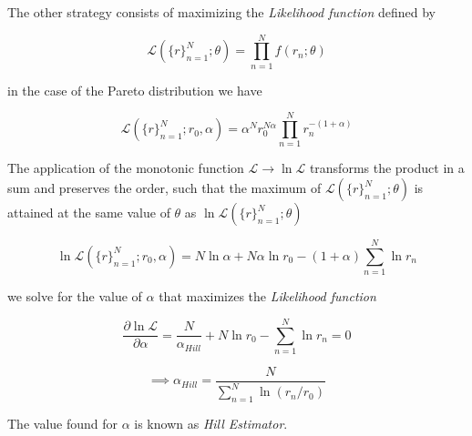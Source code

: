 \documentclass[11pt]{article}
\begin{document}
The other strategy consists of maximizing the \emph{Likelihood function}
defined by

\[\mathcal{L}(\{r\}_{n=1}^N;\theta) = \prod_{n=1}^{N}f(r_n;\theta)\]

in the case of the Pareto distribution we have

\[\mathcal{L}(\{r\}_{n=1}^N; r_0, \alpha) = \alpha^N r_0^{N\alpha} \prod_{n=1}^{N}r_n^{-(1+\alpha)}\]

The application of the monotonic function
\(\mathcal{L}\rightarrow\ln{\mathcal{L}}\) transforms the product in a
sum and preserves the order, such that the maximum of
\(\mathcal{L}(\{r\}_{n=1}^N;\theta)\) is attained at the same value of
\(\theta\) as \(\ln{\mathcal{L}(\{r\}_{n=1}^N;\theta)}\)

\[\ln{\mathcal{L}(\{r\}_{n=1}^N; r_0, \alpha)} = N\ln{\alpha} + N\alpha\ln{r_0} - (1+\alpha)\sum_{n=1}^{N}\ln{r_n}\]

we solve for the value of \(\alpha\) that maximizes the \emph{Likelihood
function}

\[\frac{\partial\ln{\mathcal{L}}}{\partial\alpha} = \frac{N}{\alpha_{Hill}} + N\ln{r_0} - \sum_{n=1}^{N}\ln{r_n} = 0\]

\[\implies \alpha_{Hill} = \frac{N}{\sum_{n=1}^{N}\ln{(r_n/r_0)}}\]

The value found for \(\alpha\) is known as \emph{Hill Estimator}.
\end{document}
